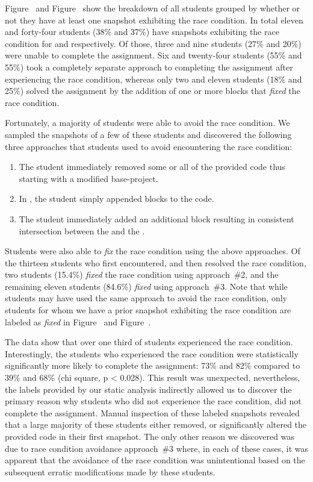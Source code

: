 Figure~ and Figure~ show the breakdown
of all students grouped by whether or not they have at least one snapshot
exhibiting the race condition. In total eleven and forty-four students (38\%
and 37\%) have snapshots exhibiting the race condition for \sone{} and \stwo{}
respectively. Of those, three and nine students (27\% and 20\%) were unable to
complete the assignment. Six and twenty-four students (55\% and 55\%) took a
completely separate approach to completing the assignment after experiencing
the race condition, whereas only two and eleven students (18\% and 25\%) solved
the assignment by the addition of one or more blocks that \emph{fixed} the race
condition.

Fortunately, a majority of students were able to avoid the race condition. We
sampled the snapshots of a few of these students and discovered the following
three approaches that students used to avoid encountering the race condition:

\begin{enumerate}
\item The student immediately removed some or all of the provided code thus
  starting with a modified base-project.
\item In \stwo{}, the student simply appended \glideto{} blocks to the code.
\item The student immediately added an additional \glideDIST{} block resulting
  in consistent intersection between the \net{} and the \zebra{}.
\end{enumerate}

Students were also able to \emph{fix} the race condition using the above
approaches. Of the thirteen students who first encountered, and then resolved
the race condition, two students (15.4\%) \emph{fixed} the race condition using
approach~\#2, and the remaining eleven students (84.6\%) \emph{fixed} using
approach~\#3. Note that while students may have used the same approach to avoid
the race condition, only students for whom we have a prior snapshot exhibiting
the race condition are labeled as \emph{fixed} in Figure~
and Figure~.

The data show that over one third of students experienced the race
condition. Interestingly, the students who experienced the race condition were
statistically significantly more likely to complete the assignment: 73\% and
82\% compared to 39\% and 68\% (chi square, p \textless{} 0.028). This result
was unexpected, nevertheless, the labels provided by our static analysis
indirectly allowed us to discover the primary reason why students who did not
experience the race condition, did not complete the assignment. Manual
inspection of these labeled snapshots revealed that a large majority of these
students either removed, or significantly altered the provided code in their
first snapshot. The only other reason we discovered was due to race condition
avoidance approach~\#3 where, in each of these cases, it was apparent that the
avoidance of the race condition was unintentional based on the subsequent
erratic modifications made by these students.

